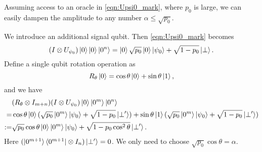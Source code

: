 \begin{exam} Assuming access to an oracle in \cref{eqn:Upsi0_mark}, where $p_0$ is large, we can easily dampen the amplitude to any number $\alpha\le \sqrt{p_0}$.
% 

We introduce an additional signal qubit. Then  \cref{eqn:Upsi0_mark} becomes
\begin{equation}
(I\otimes U_{\psi_0})\ket{0}\ket{0}\ket{0^n}=\ket{0}\sqrt{p_0}\ket{0}\ket{\psi_0}+\sqrt{1-p_0}\ket{\perp}.
\end{equation}
Define a single qubit rotation operation as 
\begin{equation}\label{eqn:controlled_rotation_simple}
R_{\theta}\ket{0}=\cos \theta \ket{0}+\sin \theta\ket{1},
\end{equation}
and we have
\begin{equation}
\begin{split}
&(R_{\theta}\otimes I_{m+n})(I\otimes U_{\psi_0})\ket{0}\ket{0^m}\ket{0^n}\\
=&\cos \theta\ket{0}(\sqrt{p_0}\ket{0^m}\ket{\psi_0}+\sqrt{1-p_0}\ket{\perp'})+
\sin \theta\ket{1}(\sqrt{p_0}\ket{0^m}\ket{\psi_0}+\sqrt{1-p_0}\ket{\perp'})\\
:=&\sqrt{p_0}\cos \theta\ket{0}\ket{0^m}\ket{\psi_0}+\sqrt{1-p_0\cos^2\theta}\ket{\perp'}.
\end{split}
\end{equation}
Here $(\ket{0^{m+1}}\bra{0^{m+1}}\otimes I_n)\ket{\perp'}=0$.
We only need to choose $\sqrt{p_0}\cos \theta=\alpha$. 

\end{exam}


